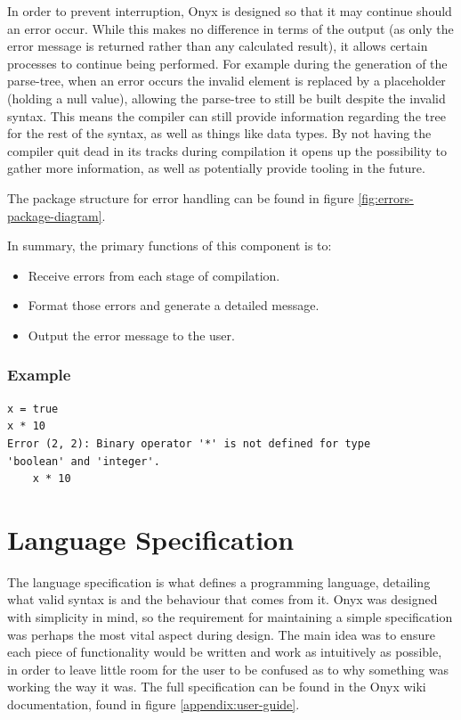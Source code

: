 \documentclass[
]{report}
\begin{document}
In order to prevent interruption, Onyx is designed so that it may
continue should an error occur. While this makes no difference in terms
of the output (as only the error message is returned rather than any
calculated result), it allows certain processes to continue being
performed. For example during the generation of the \gls{parse-tree}, when an
error occurs the invalid element is replaced by a placeholder (holding a
null value), allowing the \gls{parse-tree} to still be built despite the
invalid syntax. This means the compiler can still provide information
regarding the tree for the rest of the syntax, as well as things like
data types. By not having the compiler quit dead in its tracks during
compilation it opens up the possibility to gather more information, as
well as potentially provide tooling in the future.

The package structure for error handling can be found in figure \ref{fig:errors-package-diagram}.

In summary, the primary functions of this component is to:
\begin{itemize}
	\item Receive errors from each stage of compilation.
	\item Format those errors and generate a detailed message.
	\item Output the error message to the user.
\end{itemize}

\subsubsection{Example}
\begin{verbatim}
x = true
x * 10
Error (2, 2): Binary operator '*' is not defined for type 
'boolean' and 'integer'.
    x * 10
\end{verbatim}

\section{Language Specification}
The language specification is what defines a programming language,
detailing what valid syntax is and the behaviour that comes from it.
Onyx was designed with simplicity in mind, so the requirement for
maintaining a simple specification was perhaps the most vital aspect
during design. The main idea was to ensure each piece of functionality
would be written and work as intuitively as possible, in order to leave
little room for the user to be confused as to why something was working
the way it was. The full specification can be found in the Onyx wiki
documentation, found in figure \ref{appendix:user-guide}.
\end{document}
